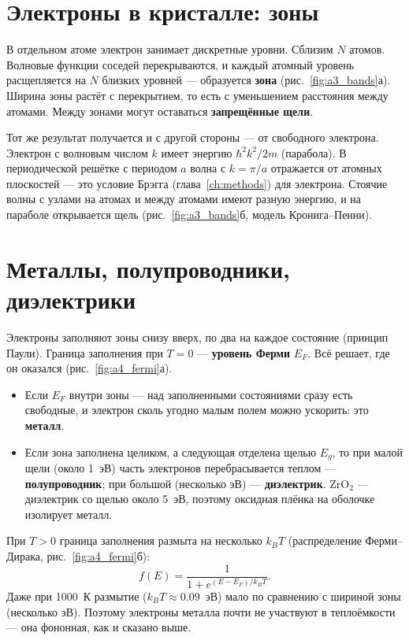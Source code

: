 \section{Электроны в кристалле: зоны}

В отдельном атоме электрон занимает дискретные уровни. Сблизим $N$ атомов. Волновые функции соседей
перекрываются, и каждый атомный уровень расщепляется на $N$ близких уровней --- образуется \textbf{зона}
(рис.~\ref{fig:a3_bands}а). Ширина зоны растёт с перекрытием, то есть с уменьшением расстояния между атомами.
Между зонами могут оставаться \textbf{запрещённые щели}.

Тот же результат получается и с другой стороны --- от свободного электрона. Электрон с волновым числом $k$
имеет энергию $\hbar^2k^2/2m$ (парабола). В периодической решётке с периодом $a$ волна с $k = \pi/a$ отражается
от атомных плоскостей --- это условие Брэгга (глава~\ref{ch:methods}) для электрона. Стоячие волны с узлами на
атомах и между атомами имеют разную энергию, и на параболе открывается щель
(рис.~\ref{fig:a3_bands}б, модель Кронига--Пенни).


\section{Металлы, полупроводники, диэлектрики}

Электроны заполняют зоны снизу вверх, по два на каждое состояние (принцип Паули). Граница заполнения при $T = 0$
--- \textbf{уровень Ферми} $E_F$. Всё решает, где он оказался (рис.~\ref{fig:a4_fermi}а).
\begin{itemize}
\item Если $E_F$ внутри зоны --- над заполненными состояниями сразу есть свободные, и электрон сколь угодно малым
  полем можно ускорить: это \textbf{металл}.
\item Если зона заполнена целиком, а следующая отделена щелью $E_g$, то при малой щели (около 1~эВ) часть
  электронов перебрасывается теплом --- \textbf{полупроводник}; при большой (несколько эВ) --- \textbf{диэлектрик}.
  ZrO$_2$ --- диэлектрик со щелью около 5~эВ, поэтому оксидная плёнка на оболочке изолирует металл.
\end{itemize}
При $T > 0$ граница заполнения размыта на несколько $k_BT$ (распределение Ферми--Дирака,
рис.~\ref{fig:a4_fermi}б):
\begin{equation}
f(E) = \frac{1}{1 + e^{(E - E_F)/k_BT}}.
\end{equation}
Даже при 1000~К размытие ($k_BT\approx0.09$~эВ) мало по сравнению с шириной зоны (несколько эВ). Поэтому
электроны металла почти не участвуют в теплоёмкости --- она фононная, как и сказано выше.

